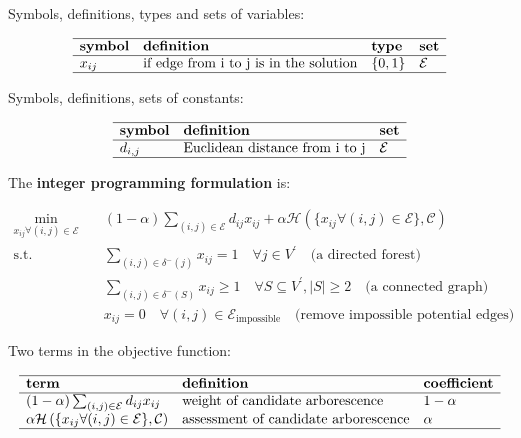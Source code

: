 \documentclass[
]{book}
\begin{document}
Symbols, definitions, types and sets of variables:

\[
\begin{array}{llll}
  \hline
  \textbf{symbol} & \textbf{definition} & \textbf{type} & \textbf{set} \\
  \hline
  x_{i j} & \text{if edge from i to j is in the solution}
  & \{0, 1\} & \mathcal{E} \\
  \hline
\end{array}
\]

Symbols, definitions, sets of constants:

\[
\begin{array}{lll}
  \hline
  \textbf{symbol} & \textbf{definition} & \textbf{set} \\
  \hline
  d_{i, j} & \text{Euclidean distance from i to j}
  & \mathcal{E} \\
  \hline
\end{array}
\]

The \textbf{integer programming formulation} is:

\[
\begin{aligned}
  \min_{x_{i j} \forall (i, j) \in \mathcal{E}} \quad
    & (1 - \alpha) \sum_{(i, j) \in \mathcal{E}} d_{i j} x_{i j}
    + \alpha \mathcal{H}
    \left(\{x_{i j} \forall (i, j) \in \mathcal{E} \}, \mathcal{C} \right) \\
  \text{s.t.} \quad & \sum_{(i, j) \in \delta^{-}(j)} x_{i j} = 1
    \quad \forall j \in V^{\prime}
    \quad \text{(a directed forest)} \\
  & \sum_{(i, j) \in \delta^{-}(S)} x_{i j} \geq 1
    \quad \forall S \subseteq V^{\prime},|S| \geq 2
    \quad \text{(a connected graph)} \\
  & x_{i j} = 0
    \quad \forall (i, j) \in \mathcal{E}_\text{impossible}
    \quad \text{(remove impossible potential edges)}
\end{aligned}
\]

Two terms in the objective function:

\[
\begin{array}{lll}
  \hline
  \textbf{term} & \textbf{definition} & \textbf{coefficient} \\
  \hline
  (1 - \alpha) \sum_{(i, j) \in \mathcal{E}} d_{i j} x_{i j}
  & \text{weight of candidate arborescence}
  & 1 - \alpha \\
  \alpha \mathcal{H}
  \left(\{x_{i j} \forall (i, j) \in \mathcal{E} \}, \mathcal{C} \right)
  & \text{assessment of candidate arborescence}
  & \alpha \\
  \hline
\end{array}
\]
\end{document}
